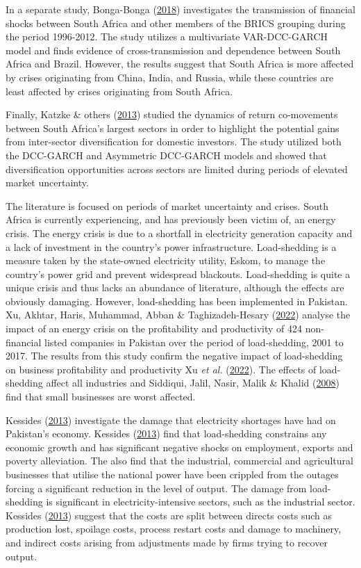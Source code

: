 \documentclass[11pt,preprint, authoryear]{elsarticle}
\numberwithin{equation}{section}
\numberwithin{figure}{section}
\numberwithin{table}{section}
\begin{document}
In a separate study, Bonga-Bonga
(\protect\hyperlink{ref-bonga2018uncovering}{2018}) investigates the
transmission of financial shocks between South Africa and other members
of the BRICS grouping during the period 1996-2012. The study utilizes a
multivariate VAR-DCC-GARCH model and finds evidence of
cross-transmission and dependence between South Africa and Brazil.
However, the results suggest that South Africa is more affected by
crises originating from China, India, and Russia, while these countries
are least affected by crises originating from South Africa.

Finally, Katzke \& others (\protect\hyperlink{ref-katzke}{2013}) studied
the dynamics of return co-movements between South Africa's largest
sectors in order to highlight the potential gains from inter-sector
diversification for domestic investors. The study utilized both the
DCC-GARCH and Asymmetric DCC-GARCH models and showed that
diversification opportunities across sectors are limited during periods
of elevated market uncertainty.

The literature is focused on periods of market uncertainty and crises.
South Africa is currently experiencing, and has previously been victim
of, an energy crisis. The energy crisis is due to a shortfall in
electricity generation capacity and a lack of investment in the
country's power infrastructure. Load-shedding is a measure taken by the
state-owned electricity utility, Eskom, to manage the country's power
grid and prevent widespread blackouts. Load-shedding is quite a unique
crisis and thus lacks an abundance of literature, although the effects
are obviously damaging. However, load-shedding has been implemented in
Pakistan. Xu, Akhtar, Haris, Muhammad, Abban \& Taghizadeh-Hesary
(\protect\hyperlink{ref-XU2022100849}{2022}) analyse the impact of an
energy crisis on the profitability and productivity of 424 non-financial
listed companies in Pakistan over the period of load-shedding, 2001 to
2017. The results from this study confirm the negative impact of
load-shedding on business profitability and productivity Xu \emph{et
al.} (\protect\hyperlink{ref-XU2022100849}{2022}). The effects of
load-shedding affect all industries and Siddiqui, Jalil, Nasir, Malik \&
Khalid (\protect\hyperlink{ref-siddiqui2008cost}{2008}) find that small
businesses are worst affected.

Kessides (\protect\hyperlink{ref-kessides2013chaos}{2013}) investigate
the damage that electricity shortages have had on Pakistan's economy.
Kessides (\protect\hyperlink{ref-kessides2013chaos}{2013}) find that
load-shedding constrains any economic growth and has significant
negative shocks on employment, exports and poverty alleviation. The also
find that the industrial, commercial and agricultural businesses that
utilise the national power have been crippled from the outages forcing a
significant reduction in the level of output. The damage from
load-shedding is significant in electricity-intensive sectors, such as
the industrial sector. Kessides
(\protect\hyperlink{ref-kessides2013chaos}{2013}) suggest that the costs
are split between directs costs such as production lost, spoilage costs,
process restart costs and damage to machinery, and indirect costs
arising from adjustments made by firms trying to recover output.
\end{document}
